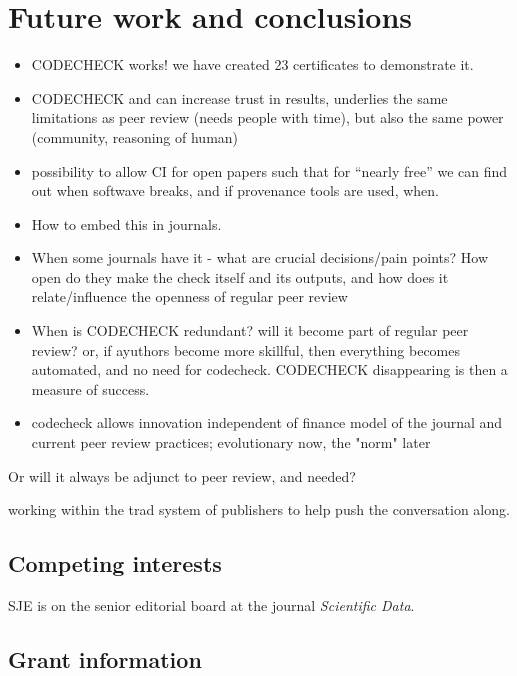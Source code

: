 \documentclass[12pt]{article}
\begin{document}
\section*{Future work and conclusions}\label{future-work-and-conclusions}

\begin{itemize}
\item
  CODECHECK works! we have created 23 certificates to demonstrate it.
\item 
  CODECHECK and can increase trust in results, underlies the same
  limitations as peer review (needs people with time), but also the same
  power (community, reasoning of human)
\item
  possibility to allow CI for open papers such that for ``nearly free''
  we can find out when softwave breaks, and if provenance tools are
  used, when.
\item
  How to embed this in journals.
\item
  When some journals have it - what are crucial decisions/pain points?
  How open do they make the check itself and its outputs, and how does it
  relate/influence the openness of regular peer review
\item
  When is CODECHECK redundant? will it become part of regular peer
  review? or, if ayuthors become more skillful, then everything becomes
  automated, and no need for codecheck. CODECHECK disappearing is then a
  measure of success.
\item
  codecheck allows innovation independent of finance model of the journal
  and current peer review practices; evolutionary now, the "norm" later
\end{itemize}

Or will it always be adjunct to peer review, and needed?

working within the trad system of publishers to help push the
conversation along.




\subsection*{Competing interests}

SJE is on the senior editorial board at the journal \emph{Scientific
Data}.

\subsection*{Grant information}
\end{document}
